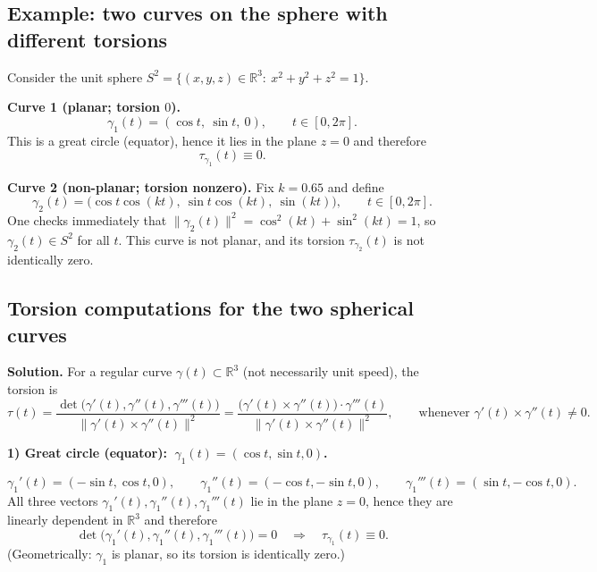 \documentclass[12pt,a4paper]{article}
\theoremstyle{plain}
\theoremstyle{definition}      %
\begin{document}

\subsection*{Example: two curves on the sphere with different torsions}

Consider the unit sphere $S^2=\{(x,y,z)\in\mathbb{R}^3:\ x^2+y^2+z^2=1\}$.

\medskip
\noindent\textbf{Curve 1 (planar; torsion $0$).}
\[
\gamma_1(t)=(\cos t,\ \sin t,\ 0),\qquad t\in[0,2\pi].
\]
This is a great circle (equator), hence it lies in the plane $z=0$ and therefore
\[
\tau_{\gamma_1}(t)\equiv 0.
\]

\medskip
\noindent\textbf{Curve 2 (non-planar; torsion nonzero).}
Fix $k=0.65$ and define
\[
\gamma_2(t)=\bigl(\cos t\cos(kt),\ \sin t\cos(kt),\ \sin(kt)\bigr),\qquad t\in[0,2\pi].
\]
One checks immediately that $\|\gamma_2(t)\|^2=\cos^2(kt)+\sin^2(kt)=1$, so $\gamma_2(t)\in S^2$ for all $t$.
This curve is not planar, and its torsion $\tau_{\gamma_2}(t)$ is not identically zero.



\subsection*{Torsion computations for the two spherical curves}

\noindent\textbf{Solution.}
For a regular curve $\gamma(t)\subset\mathbb{R}^3$ (not necessarily unit speed), the torsion is
\[
\tau(t)=\frac{\det\bigl(\gamma'(t),\gamma''(t),\gamma'''(t)\bigr)}{\|\gamma'(t)\times\gamma''(t)\|^2}
=
\frac{\bigl(\gamma'(t)\times\gamma''(t)\bigr)\cdot \gamma'''(t)}{\|\gamma'(t)\times\gamma''(t)\|^2},
\qquad \text{whenever } \gamma'(t)\times\gamma''(t)\neq 0.
\]

\bigskip

\noindent\textbf{1) Great circle (equator): $\ \gamma_1(t)=(\cos t,\sin t,0)$.}

\[
\gamma_1'(t)=(-\sin t,\cos t,0),\qquad
\gamma_1''(t)=(-\cos t,-\sin t,0),\qquad
\gamma_1'''(t)=(\sin t,-\cos t,0).
\]
All three vectors $\gamma_1'(t),\gamma_1''(t),\gamma_1'''(t)$ lie in the plane $z=0$, hence they are linearly dependent
in $\mathbb{R}^3$ and therefore
\[
\det\bigl(\gamma_1'(t),\gamma_1''(t),\gamma_1'''(t)\bigr)=0
\quad\Longrightarrow\quad
\tau_{\gamma_1}(t)\equiv 0.
\]
(Geometrically: $\gamma_1$ is planar, so its torsion is identically zero.)
\end{document}

